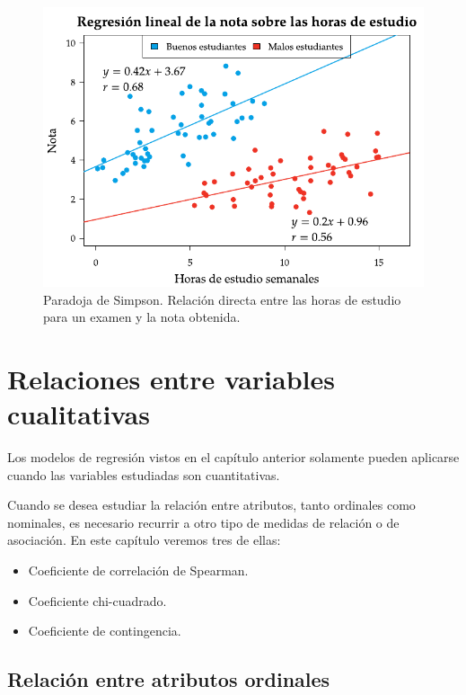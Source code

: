 \documentclass[
  a4paper,
]{scrreport}
\providecommand{\tightlist}{%
  \setlength{\itemsep}{0pt}\setlength{\parskip}{0pt}}\usepackage{longtable,booktabs,array}
\theoremstyle{plain}
\theoremstyle{definition}
\theoremstyle{definition}
\theoremstyle{remark}
\begin{document}
\begin{figure}[H]

{\centering \includegraphics{img/regresion/paradoja_simpson_2.pdf}

}

\caption{Paradoja de Simpson. Relación directa entre las horas de
estudio para un examen y la nota obtenida.}

\end{figure}%


\chapter{Relaciones entre variables
cualitativas}\label{relaciones-entre-variables-cualitativas}

Los modelos de regresión vistos en el capítulo anterior solamente pueden
aplicarse cuando las variables estudiadas son cuantitativas.

Cuando se desea estudiar la relación entre atributos, tanto ordinales
como nominales, es necesario recurrir a otro tipo de medidas de relación
o de asociación. En este capítulo veremos tres de ellas:

\begin{itemize}
\tightlist
\item
  Coeficiente de correlación de Spearman.
\item
  Coeficiente chi-cuadrado.
\item
  Coeficiente de contingencia.
\end{itemize}

\section{Relación entre atributos
ordinales}\label{relaciuxf3n-entre-atributos-ordinales}
\end{document}
